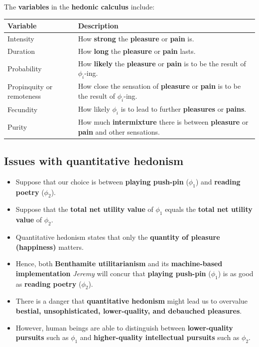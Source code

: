 \documentclass[11pt]{article}
\begin{document}
The \textbf{variables} in the \textbf{hedonic calculus} include:
\begin{center}
\begin{tabular}{|m{5em}|m{25em}|}
\hline
Variable & Description\\
\hline
Intensity & How \textbf{strong} the \textbf{pleasure} or \textbf{pain} is.\\
\hline
Duration & How \textbf{long} the \textbf{pleasure} or \textbf{pain} lasts.\\
\hline
Probability & How \textbf{likely} the \textbf{pleasure} or \textbf{pain} is to be the result of \(\phi_i\)-ing.\\
\hline
Propinquity or remoteness & How close the sensation of \textbf{pleasure} or \textbf{pain} is to be the result of \(\phi_i\)-ing.\\
\hline
Fecundity & How likely \(\phi_i\) is to lead to further \textbf{pleasures} or \textbf{pains}.\\
\hline
Purity & How much \textbf{intermixture} there is between \textbf{pleasure} or \textbf{pain} and other sensations.\\
\hline
\end{tabular}
\end{center}
\subsection{Issues with quantitative hedonism}
\label{sec:org64e8b3e}
\begin{itemize}
\item Suppose that our choice is between \textbf{playing push-pin} (\(\phi_1\)) and \textbf{reading poetry} (\(\phi_2\)).
\item Suppose that the \textbf{total net utility value} of \(\phi_1\) equals the \textbf{total net utility value} of \(\phi_2\).
\item Quantitative hedonism states that only the \textbf{quantity of pleasure (happiness)} matters.
\item Hence, both \textbf{Benthamite utilitarianism} and its \textbf{machine-based implementation} \emph{Jeremy} will concur that \textbf{playing push-pin} (\(\phi_1\)) is as good as \textbf{reading poetry} (\(\phi_2\)).
\item There is a danger that \textbf{quantitative hedonism} might lead us to overvalue \textbf{bestial, unsophisticated, lower-quality, and debauched pleasures}.
\item However, human beings are able to distinguish between \textbf{lower-quality pursuits} such as \(\phi_1\) and \textbf{higher-quality intellectual pursuits} such as \(\phi_2\).
\end{itemize}
\end{document}
